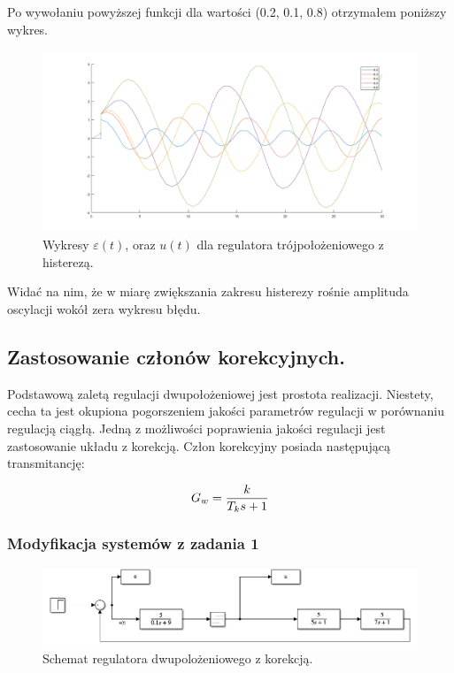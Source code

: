 \documentclass[a4paper,10pt]{article}
\begin{document}
Po wywołaniu powyższej funkcji dla wartości (0.2, 0.1, 0.8) otrzymałem poniższy wykres.

\begin{figure}[!h]
    \centering
	\includegraphics[width=120mm]{troj_z_his.png}
	\caption{Wykresy $\varepsilon(t)$, oraz $u(t)$ dla regulatora trójpołożeniowego z histerezą.}
    \label{fig:Rysunek}
\end{figure}

\newpage Widać na nim, że w miarę zwiększania zakresu histerezy rośnie amplituda oscylacji wokół zera wykresu błędu.


\subsection{Zastosowanie członów korekcyjnych.}\label{sec:zad2}
Podstawową zaletą regulacji dwupołożeniowej jest prostota realizacji. Niestety, cecha ta jest
okupiona pogorszeniem jakości parametrów regulacji w porównaniu regulacją ciągłą.
Jedną z możliwości poprawienia jakości regulacji jest zastosowanie układu z korekcją.
\newline
Człon korekcyjny posiada następującą transmitancję:

\begin{equation} \label{eqn:trans_czl_kor}
	G_w={{k} \over {T_k s+1}}
\end{equation}

\subsubsection{Modyfikacja systemów z zadania 1}\label{sec:zad2_1}
\begin{figure}[!h]
    \centering
	\includegraphics[width=120mm]{dwu_kor_schemat.png}
	\caption{Schemat regulatora dwupolożeniowego z korekcją.}
    \label{fig:Rysunek}
\end{figure}
\end{document}
